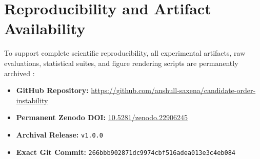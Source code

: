 \documentclass[11pt,a4paper]{article}
\begin{document}
\section{Reproducibility and Artifact Availability}

To support complete scientific reproducibility, all experimental artifacts, raw evaluations, statistical suites, and figure rendering scripts are permanently archived \citep{saxena2026candidate}:
\begin{itemize}
    \item \textbf{GitHub Repository:} \url{https://github.com/anshull-saxena/candidate-order-instability}
    \item \textbf{Permanent Zenodo DOI:} \href{https://doi.org/10.5281/zenodo.22906245}{10.5281/zenodo.22906245}
    \item \textbf{Archival Release:} \texttt{v1.0.0}
    \item \textbf{Exact Git Commit:} \texttt{266bbb902871dc9974cbf516adea013e3c4eb084}
\end{itemize}



\end{document}
